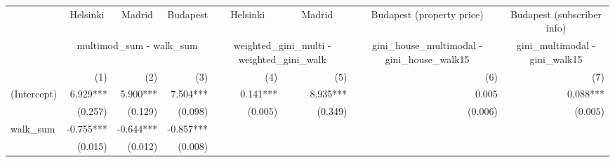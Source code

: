 \begin{tabular}{lrrrrrrr}
\toprule
                                           & \multicolumn{1}{c}{Helsinki} & \multicolumn{1}{c}{Madrid} & \multicolumn{1}{c}{Budapest} &   \multicolumn{1}{c}{Helsinki}   &   \multicolumn{1}{c}{Madrid}   &           \multicolumn{1}{c}{Budapest (property price)}           &    \multicolumn{1}{c}{Budapest (subscriber info)}   \\ 
\cmidrule(lr){2-2} \cmidrule(lr){3-3} \cmidrule(lr){4-4} \cmidrule(lr){5-5} \cmidrule(lr){6-6} \cmidrule(lr){7-7} \cmidrule(lr){8-8} 
                                           &                       \multicolumn{3}{c}{multimod\_sum - walk\_sum}                      &  \multicolumn{2}{c}{weighted\_gini\_multi - weighted\_gini\_walk} & \multicolumn{1}{c}{gini\_house\_multimodal - gini\_house\_walk15} & \multicolumn{1}{c}{gini\_multimodal - gini\_walk15} \\ 
\cmidrule(lr){2-4} \cmidrule(lr){5-6} \cmidrule(lr){7-7} \cmidrule(lr){8-8} 
                                           &                          (1) &                        (2) &                          (3) &                              (4) &                            (5) &                                                               (6) &                                                 (7) \\ 
\midrule
(Intercept)                                &                     6.929*** &                   5.900*** &                     7.504*** &                         0.141*** &                       8.935*** &                                                             0.005 &                                            0.088*** \\ 
                                           &                      (0.257) &                    (0.129) &                      (0.098) &                          (0.005) &                        (0.349) &                                                           (0.006) &                                             (0.005) \\ 
walk\_sum                                  &                    -0.755*** &                  -0.644*** &                    -0.857*** &                                  &                                &                                                                   &                                                     \\ 
                                           &                      (0.015) &                    (0.012) &                      (0.008) &                                  &                                &                                                                   &                                                     \\ 

\end{tabular}
